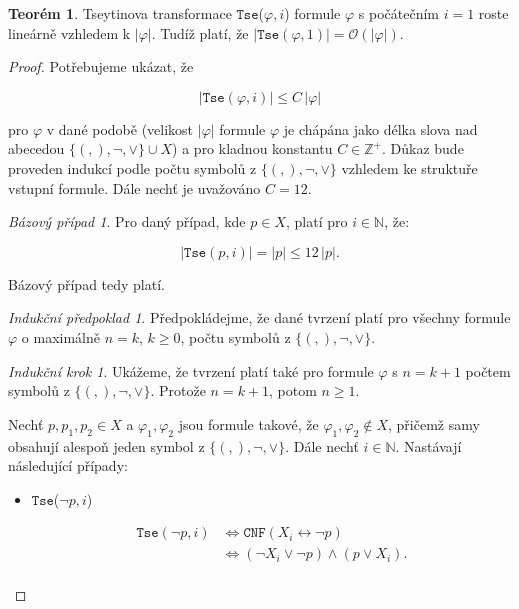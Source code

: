 \documentclass[a4paper, 12pt]{article}
\theoremstyle{definition}
\theoremstyle{definition}
\newtheorem{theorem}{Teorém}[section]
\theoremstyle{definition}
\theoremstyle{remark}
\theoremstyle{remark}
\newtheorem*{basis}{Bázový případ}
\theoremstyle{remark}
\newtheorem*{inductionhypothesis}{Indukční předpoklad}
\theoremstyle{remark}
\newtheorem*{inductionstep}{Indukční krok}
\begin{document}
\begin{theorem}
    Tseytinova transformace $\texttt{Tse}$($\varphi, i$) formule $\varphi$ s počátečním $i = 1$ roste lineárně vzhledem k $|\varphi|$. Tudíž platí, že $|\texttt{Tse}(\varphi, 1)| = \mathcal{O}(|\varphi|)$.
\end{theorem}

\begin{proof}
    Potřebujeme ukázat, že

    $$|\texttt{Tse}(\varphi, i)| \leq C \, |\varphi|$$

    \noindent
    pro $\varphi$ v dané podobě (velikost $|\varphi|$ formule $\varphi$ je chápána jako délka slova nad abecedou $\{(, ), \neg, \lor\} \cup X$) a pro kladnou konstantu $C \in \mathbb{Z}^+$. Důkaz bude proveden indukcí podle počtu symbolů z $\{(, ), \neg, \lor\}$ vzhledem ke struktuře vstupní formule. Dále nechť je uvažováno $C = 12$.

    \begin{basis}
    Pro daný případ, kde $p \in X$, platí pro $i \in \mathbb{N}$, že:
        
    $$|\texttt{Tse}(p, i)| = |p| \leq 12 \, |p|.$$

    \noindent
    Bázový případ tedy platí.
    \end{basis}

    \begin{inductionhypothesis}
        Předpokládejme, že dané tvrzení platí pro všechny formule $\varphi$ o maximálně $n = k$, $k \geq 0$, počtu symbolů z $\{(, ), \neg, \lor\}$.
    \end{inductionhypothesis}

    \begin{inductionstep}
        Ukážeme, že tvrzení platí také pro formule $\varphi$ s $n = k + 1$ počtem symbolů z $\{(, ), \neg, \lor\}$. Protože $n = k + 1$, potom $n \geq 1$.
        
        Nechť $p, p_1, p_2 \in X$ a $\varphi_1, \varphi_2$ jsou formule takové, že $\varphi_1, \varphi_2 \not\in X$, přičemž samy obsahují alespoň jeden symbol z $\{(, ), \neg, \lor\}$. Dále nechť $i \in \mathbb{N}$. Nastávají následující případy:    

    \begin{itemize}
        \item $\texttt{Tse}$($\neg p, i$)

        \begin{align*}
            \texttt{Tse}(\neg p, i) &\Longleftrightarrow \texttt{CNF}(X_i \leftrightarrow \neg p) \\
            &\Longleftrightarrow (\neg X_i \lor \neg p) \wedge (p \lor X_i).\\
        \end{align*}


\end{itemize}
\end{inductionstep}
\end{proof}
\end{document}
